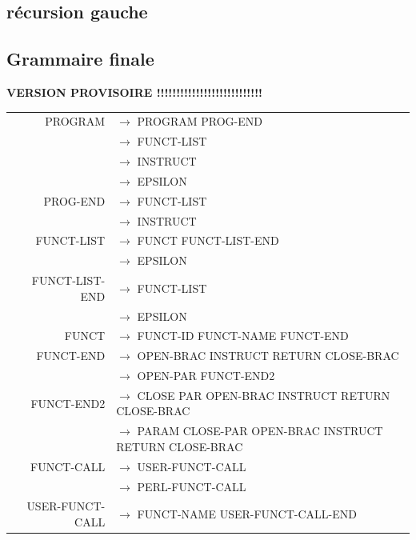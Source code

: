 \documentclass[a4paper,10pt]{article}
\begin{document}
\subsection{récursion gauche}




\pagebreak
\subsection{Grammaire finale}
\textbf{VERSION PROVISOIRE !!!!!!!!!!!!!!!!!!!!!!!!!!!}
~\\
\hspace{-3.5cm}\begin{tabular}{rl}
PROGRAM				& $\rightarrow$ PROGRAM PROG-END \\
					& $\rightarrow$ FUNCT-LIST\\
					& $\rightarrow$ INSTRUCT\\
					& $\rightarrow$ EPSILON\\
PROG-END			& $\rightarrow$ FUNCT-LIST\\
					& $\rightarrow$ INSTRUCT\\
					
FUNCT-LIST			& $\rightarrow$ FUNCT FUNCT-LIST-END\\
					& $\rightarrow$ EPSILON\\
					
FUNCT-LIST-END		& $\rightarrow$ FUNCT-LIST\\
					& $\rightarrow$ EPSILON\\
					
FUNCT				& $\rightarrow$ FUNCT-ID FUNCT-NAME FUNCT-END \\

FUNCT-END			& $\rightarrow$ OPEN-BRAC INSTRUCT RETURN CLOSE-BRAC \\
					& $\rightarrow$ OPEN-PAR FUNCT-END2 \\

FUNCT-END2			& $\rightarrow$ CLOSE PAR OPEN-BRAC INSTRUCT RETURN CLOSE-BRAC \\
					& $\rightarrow$ PARAM CLOSE-PAR OPEN-BRAC INSTRUCT RETURN CLOSE-BRAC \\

FUNCT-CALL			& $\rightarrow$ USER-FUNCT-CALL \\
					& $\rightarrow$ PERL-FUNCT-CALL \\

USER-FUNCT-CALL		& $\rightarrow$ FUNCT-NAME USER-FUNCT-CALL-END\\ 


\end{tabular}
\end{document}
